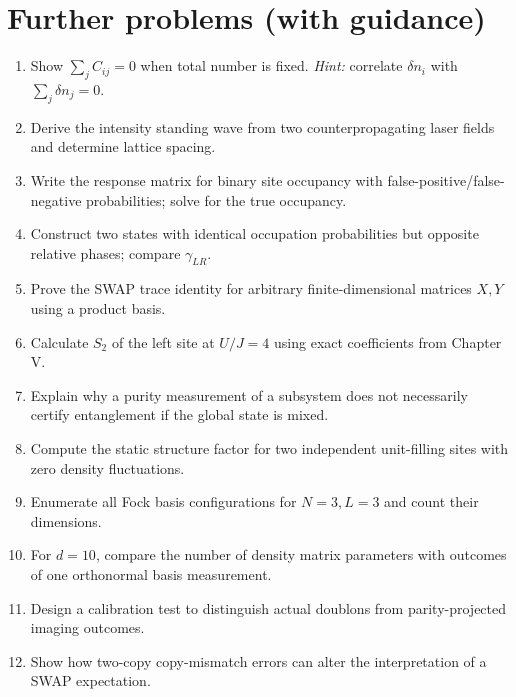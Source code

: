 \documentclass[11pt,a4paper]{article}
\begin{document}
\section{Further problems (with guidance)}
\begin{enumerate}[leftmargin=*,itemsep=4pt]
\item Show $\sum_j C_{ij}=0$ when total number is fixed. \emph{Hint:} correlate $\delta n_i$ with $\sum_j\delta n_j=0$.
\item Derive the intensity standing wave from two counterpropagating laser fields and determine lattice spacing.
\item Write the response matrix for binary site occupancy with false-positive/false-negative probabilities; solve for the true occupancy.
\item Construct two states with identical occupation probabilities but opposite relative phases; compare $\gamma_{LR}$.
\item Prove the SWAP trace identity for arbitrary finite-dimensional matrices $X,Y$ using a product basis.
\item Calculate $S_2$ of the left site at $U/J=4$ using exact coefficients from Chapter V.
\item Explain why a purity measurement of a subsystem does not necessarily certify entanglement if the global state is mixed.
\item Compute the static structure factor for two independent unit-filling sites with zero density fluctuations.
\item Enumerate all Fock basis configurations for $N=3,L=3$ and count their dimensions.
\item For $d=10$, compare the number of density matrix parameters with outcomes of one orthonormal basis measurement.
\item Design a calibration test to distinguish actual doublons from parity-projected imaging outcomes.
\item Show how two-copy copy-mismatch errors can alter the interpretation of a SWAP expectation.
\end{enumerate}
\end{document}
